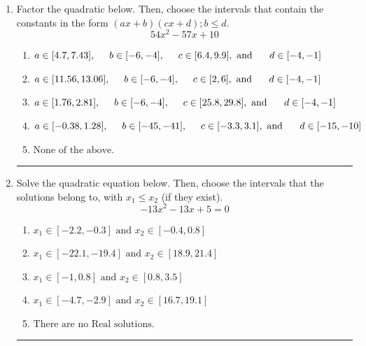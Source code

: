 \documentclass[14pt]{extbook}
\newcommand{\litem}[1]{\item#1\hspace*{-1cm}\rule{\textwidth}{0.4pt}}
\begin{document}
\begin{enumerate}
{\begin{enumerate}[label=\Alph*.]
\end{enumerate} }
\litem{
Factor the quadratic below. Then, choose the intervals that contain the constants in the form $(ax+b)(cx+d); b \leq d.$\[ 54x^{2} -57 x + 10 \]\begin{enumerate}[label=\Alph*.]
\item \( a \in [4.7, 7.43], \hspace*{5mm} b \in [-6, -4], \hspace*{5mm} c \in [6.4, 9.9], \text{ and } \hspace*{5mm} d \in [-4, -1] \)
\item \( a \in [11.56, 13.06], \hspace*{5mm} b \in [-6, -4], \hspace*{5mm} c \in [2, 6], \text{ and } \hspace*{5mm} d \in [-4, -1] \)
\item \( a \in [1.76, 2.81], \hspace*{5mm} b \in [-6, -4], \hspace*{5mm} c \in [25.8, 29.8], \text{ and } \hspace*{5mm} d \in [-4, -1] \)
\item \( a \in [-0.38, 1.28], \hspace*{5mm} b \in [-45, -41], \hspace*{5mm} c \in [-3.3, 3.1], \text{ and } \hspace*{5mm} d \in [-15, -10] \)
\item \( \text{None of the above.} \)

\end{enumerate} }
\litem{
Solve the quadratic equation below. Then, choose the intervals that the solutions belong to, with $x_1 \leq x_2$ (if they exist).\[ -13x^{2} -13 x + 5 = 0 \]\begin{enumerate}[label=\Alph*.]
\item \( x_1 \in [-2.2, -0.3] \text{ and } x_2 \in [-0.4, 0.8] \)
\item \( x_1 \in [-22.1, -19.4] \text{ and } x_2 \in [18.9, 21.4] \)
\item \( x_1 \in [-1, 0.8] \text{ and } x_2 \in [0.8, 3.5] \)
\item \( x_1 \in [-4.7, -2.9] \text{ and } x_2 \in [16.7, 19.1] \)
\item \( \text{There are no Real solutions.} \)


\end{enumerate}}
\end{enumerate}
\end{document}
